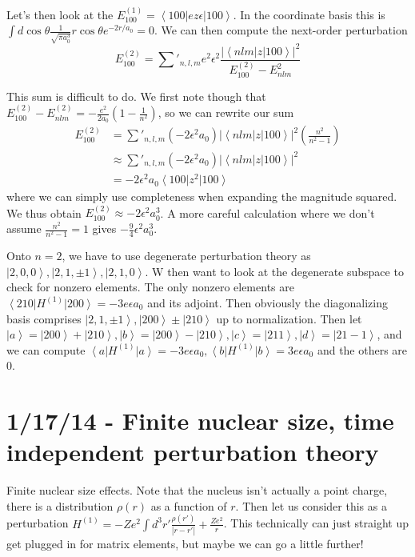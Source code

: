 \documentclass[10pt]{report}
\newcommand{\bra}[1]{\left<#1\right|}
\newcommand{\ket}[1]{\left|#1\right>}
\newcommand{\abs}[1]{\left|#1\right|}
\begin{document}
Let's then look at the $E^{(1)}_{100} = \bra{100}ez\epsilon\ket{100}$. In the coordinate basis this is $\int d\cos\theta \frac{1}{\sqrt{\pi a_0^3}} r\cos \theta e^{-2r/a_0} = 0$. We can then compute the next-order perturbation
$$E^{(2)}_{100} = \sum'_{n,l,m} e^2\epsilon^2 \frac{\abs{\bra{nlm}z\ket{100}}^2}{E_{100}^{(2)} - E_{nlm}^2}$$

This sum is difficult to do. We first note though that $E_{100}^{(2)} - E_{nlm}^{(2)} = -\frac{e^2}{2a_0}\left( 1-\frac{1}{n^2} \right)$, so we can rewrite our sum
\begin{align}
    E^{(2)}_{100} &= \sum'_{n,l,m} \left( -2\epsilon^2 a_0 \right) \abs{\bra{nlm}z\ket{100}}^2\left( \frac{n^2}{n^2 - 1} \right)\\
    &\approx \sum'_{n,l,m} \left( -2\epsilon^2 a_0 \right) \abs{\bra{nlm}z\ket{100}}^2\\
    &= -2\epsilon^2 a_0 \bra{100}z^2\ket{100}
\end{align}
where we can simply use completeness when expanding the magnitude squared. We thus obtain $E^{(2)}_{100} \approx -2\epsilon^2 a_0^3$. A more careful calculation where we don't assume $\frac{n^2}{n^2 - 1} = 1$ gives $-\frac{9}{4}\epsilon^2 a_0^3$. 

Onto $n=2$, we have to use degenerate perturbation theory as $\ket{2,0,0}, \ket{2,1,\pm 1}, \ket{2,1,0}$. W then want to look at the degenerate subspace to check for nonzero elements. The only nonzero elements are $\bra{210}H^{(1)}\ket{200} = -3e\epsilon a_0$ and its adjoint. Then obviously the diagonalizing basis comprises $\ket{2,1,\pm 1}, \ket{200}\pm \ket{210}$ up to normalization. Then let $\ket{a} = \ket{200} + \ket{210}, \ket{b} = \ket{200} - \ket{210}, \ket{c} = \ket{211}, \ket{d} = \ket{21-1}$, and we can compute $\bra{a}H^{(1)}\ket{a} = -3e\epsilon a_0, \bra{b}H^{(1)} \ket{b} = 3e\epsilon a_0$ and the others are $0$. 
\chapter{1/17/14 - Finite nuclear size, time independent perturbation theory}

Finite nuclear size effects. Note that the nucleus isn't actually a point charge, there is a distribution $\rho(r)$ as a function of $r$. Then let us consider this as a perturbation $H^{(1)} = -Ze^2\int d^3r' \frac{\rho(r')}{\abs{r-r'}} + \frac{Ze^2}{r}$. This technically can just straight up get plugged in for matrix elements, but maybe we can go a little further!
\end{document}
